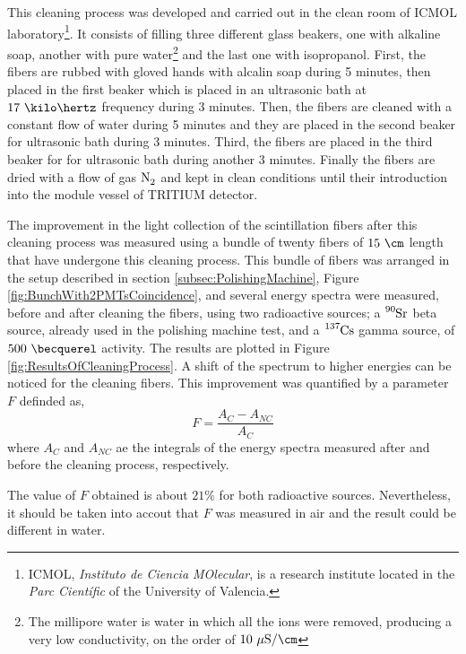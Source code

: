 This cleaning process  was developed and carried out in the clean room of ICMOL laboratory\footnote{ICMOL, \textit{Instituto de Ciencia MOlecular}, is a research institute located in the \textit{Parc Científic} of the University of Valencia.}. It consists of filling three different glass beakers, one with alkaline soap, another with pure water\footnote{The millipore water is water in which all the ions were removed, producing a very low conductivity, on the order of $10~\mu\text{S}/\cm$} and the last one with isopropanol. First, the fibers are rubbed with gloved hands with alcalin soap during 5 minutes, then placed in the first beaker which is placed in an ultrasonic bath at $17~\kilo\hertz$ frequency during 3 minutes. Then, the fibers are cleaned with a constant flow of water during 5 minutes and they are placed in the second beaker for ultrasonic bath during 3 minutes. Third, the fibers are placed in the third beaker for for ultrasonic bath during another 3 minutes. Finally the fibers are dried with a flow of gas $\ce{N_2}$ and kept in clean conditions until their introduction into the module vessel of TRITIUM detector.

The improvement in the light collection of the scintillation fibers after this cleaning process was measured using a bundle of twenty fibers of $15~\cm$ length that have undergone this cleaning process. This bundle of fibers was arranged in the setup described in section \ref{subsec:PolishingMachine}, Figure \ref{fig:BunchWith2PMTsCoincidence}, and several energy spectra were measured, before and after cleaning the fibers, using two radioactive sources; a $\ce{^{90}Sr}$ beta source, already used in the polishing machine test, and a $\ce{^{137}Cs}$ gamma source, of $500~\becquerel$ activity. The results are plotted in Figure \ref{fig:ResultsOfCleaningProcess}. A shift of the spectrum to higher energies can be noticed for the cleaning fibers. This improvement was quantified by a parameter $F$ definded as,
\begin{equation}
F=\frac{A_{C}-A_{NC}}{A_{C}}
\label{eq:RelativeImprovement}
\end{equation}
where $A_{C}$ and $A_{NC}$ ae the integrals of the energy spectra measured after and before the cleaning process, respectively.

The value of $F$ obtained is about $21\%$ for both radioactive sources. Nevertheless, it should be taken into accout that $F$ was measured in air and the result could be different in water.

